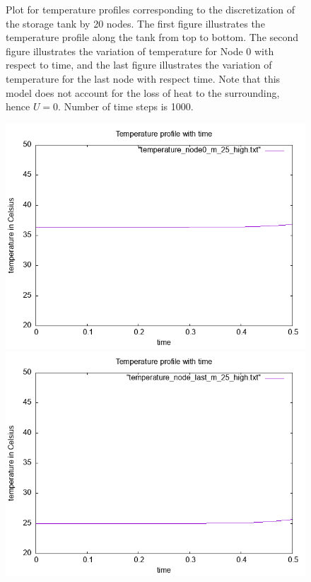 \documentclass{article}
\begin{document}
\begin{figure}[ht]
\caption{Plot for temperature profiles corresponding to the discretization of the storage tank by 20 nodes. The first figure illustrates the temperature profile along the tank from top to bottom. The second figure illustrates the variation of temperature for Node 0 with respect to time, and the last figure illustrates the variation of temperature for the last node with respect time. Note that this model does not account for the loss of heat to the surrounding, hence $U = 0$. Number of time steps is 1000. }
\end{figure}



\begin{figure}[ht]
\centering
\includegraphics[scale =0.4]{figures/temperature_node0_N_20_m_25.png}
\includegraphics[scale =0.4]{figures/temperature_node_last_N_20_m_25.png}

\end{figure}
\end{document}
